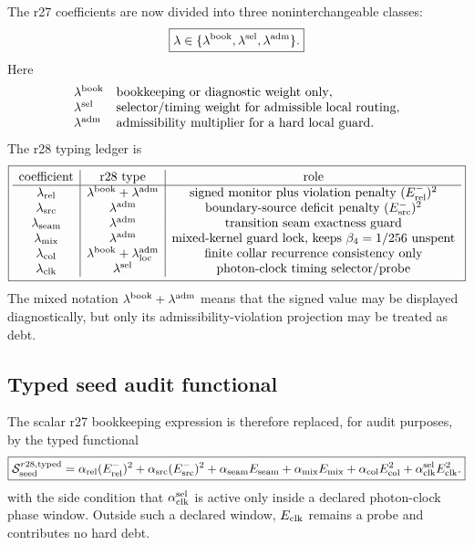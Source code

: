 The r27 coefficients are now divided into three noninterchangeable classes:
\[
\boxed{
\lambda\in
\{\lambda^{\rm book},\lambda^{\rm sel},\lambda^{\rm adm}\}.
}
\]
Here
\[
\begin{array}{ll}
\lambda^{\rm book} & \text{bookkeeping or diagnostic weight only},\\
\lambda^{\rm sel}  & \text{selector/timing weight for admissible local routing},\\
\lambda^{\rm adm}  & \text{admissibility multiplier for a hard local guard.}
\end{array}
\]
The r28 typing ledger is
\[
\boxed{
\begin{array}{c|c|c}
\text{coefficient} & \text{r28 type} & \text{role}\\
\hline
\lambda_{\rm rel} & \lambda^{\rm book}+\lambda^{\rm adm} &
\text{signed monitor plus violation penalty }(E_{\rm rel}^{-})^2\\
\lambda_{\rm src} & \lambda^{\rm adm} &
\text{boundary-source deficit penalty }(E_{\rm src}^{-})^2\\
\lambda_{\rm seam} & \lambda^{\rm adm} &
\text{transition seam exactness guard}\\
\lambda_{\rm mix} & \lambda^{\rm adm} &
\text{mixed-kernel guard lock, keeps }\beta_4=1/256\text{ unspent}\\
\lambda_{\rm col} & \lambda^{\rm book}+\lambda^{\rm adm}_{\rm loc} &
\text{finite collar recurrence consistency only}\\
\lambda_{\rm clk} & \lambda^{\rm sel} &
\text{photon-clock timing selector/probe}
\end{array}
}
\]
The mixed notation \(\lambda^{\rm book}+\lambda^{\rm adm}\) means that the
signed value may be displayed diagnostically, but only its admissibility-violation
projection may be treated as debt.

\subsection{Typed seed audit functional}
\label{subsec:v470-r28-typed-seed-audit-functional}

The scalar r27 bookkeeping expression is therefore replaced, for audit purposes,
by the typed functional
\[
\boxed{
\mathcal S_{\rm seed}^{r28,\rm typed}
=
\alpha_{\rm rel}(E_{\rm rel}^{-})^2
+\alpha_{\rm src}(E_{\rm src}^{-})^2
+\alpha_{\rm seam}E_{\rm seam}
+\alpha_{\rm mix}E_{\rm mix}
+\alpha_{\rm col}E_{\rm col}^2
+\alpha_{\rm clk}^{\rm sel}E_{\rm clk}^2.
}
\]
with the side condition that \(\alpha_{\rm clk}^{\rm sel}\) is active only inside
a declared photon-clock phase window.  Outside such a declared window,
\(E_{\rm clk}\) remains a probe and contributes no hard debt.

